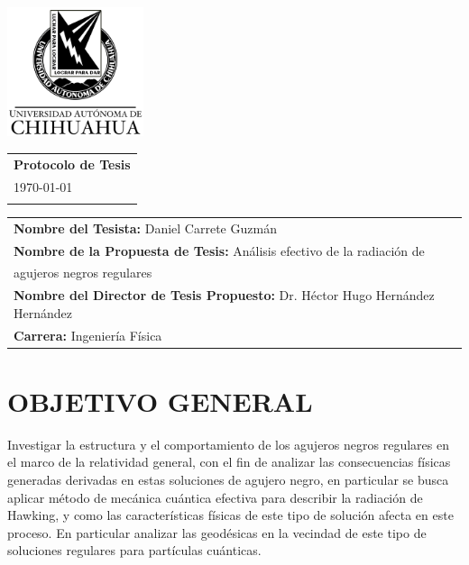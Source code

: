\documentclass[a4paper,12pt]{article}
\begin{document}



\thispagestyle{empty} 
\begin{minipage}[]{0.25\linewidth}
    \includegraphics[width=4cm]{escudo.png}\\
\end{minipage}
\begin{minipage}[ht]{0.75\linewidth}
    \begin{tabular}{p{11.5cm}} 
    {\Large \bf Protocolo de Tesis} \\
    \today  \\ 
    \hline 
    \\
    \end{tabular} 
\end{minipage}

\vspace{0.4cm}
\begin{flushleft}
    \begin{tabular}{ll}
        \textbf{Nombre del Tesista:}  Daniel Carrete Guzmán \\
        \textbf{Nombre de la Propuesta de Tesis:} Análisis efectivo de la radiación de \\ 
        agujeros negros regulares   \\
        \textbf{Nombre del Director de Tesis Propuesto:}  Dr. Héctor Hugo Hernández Hernández \\
        \textbf{Carrera:}  Ingeniería Física \\
    \end{tabular}
\end{flushleft}


\section*{OBJETIVO GENERAL}
Investigar la estructura y el comportamiento de los agujeros negros regulares en el marco de la relatividad general, con el fin de analizar 
las consecuencias físicas generadas derivadas en estas soluciones de agujero negro, en particular se busca aplicar método de mecánica cuántica  efectiva \cite{bojowald-2006A, bojowald-2006B} para describir la radiación de Hawking, y como las características físicas de este tipo de solución afecta en este proceso. En particular analizar las  geodésicas en la vecindad de este tipo de soluciones regulares para partículas cuánticas.
\end{document}
